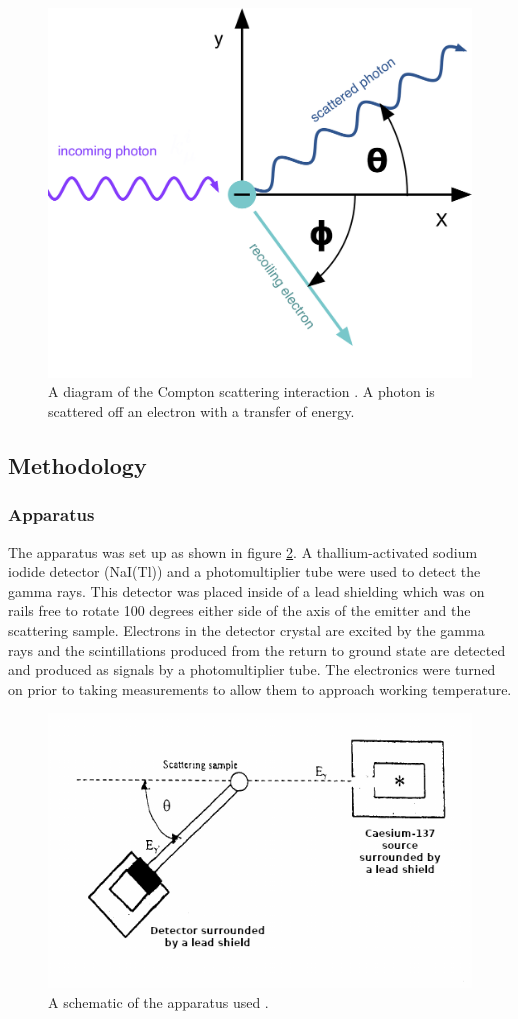 \documentclass[%
reprint,
amsmath,amssymb,
aps,
]{revtex4-2}
\begin{document}
			\begin{figure}
				\includegraphics[width=0.7\columnwidth]{compton_scattering.png}
				\caption{\label{fig:diagram}A diagram of the Compton scattering interaction \cite{comptonFIU}. A photon is scattered off an electron with a transfer of energy.}
			\end{figure}
		
		\subsection{Methodology}
					
			\subsubsection{Apparatus}			
			
			The apparatus was set up as shown in figure \ref{fig:apparatus1}. A thallium-activated sodium iodide detector (NaI(Tl)) and a photomultiplier tube were used to detect the gamma rays. This detector was placed inside of a lead shielding which was on rails free to rotate 100 degrees either side of the axis of the emitter and the scattering sample. Electrons in the detector crystal are excited by the gamma rays and the scintillations produced from the return to ground state are detected and produced as signals by a photomultiplier tube. The electronics were turned on prior to taking measurements to allow them to approach working temperature.\\
			
			\begin{figure}
				\includegraphics[width=0.85\columnwidth]{apparatus1.png}
				\caption{\label{fig:apparatus1}A schematic of the apparatus used \cite{manual1}.}
			\end{figure}					
			
\end{document}
